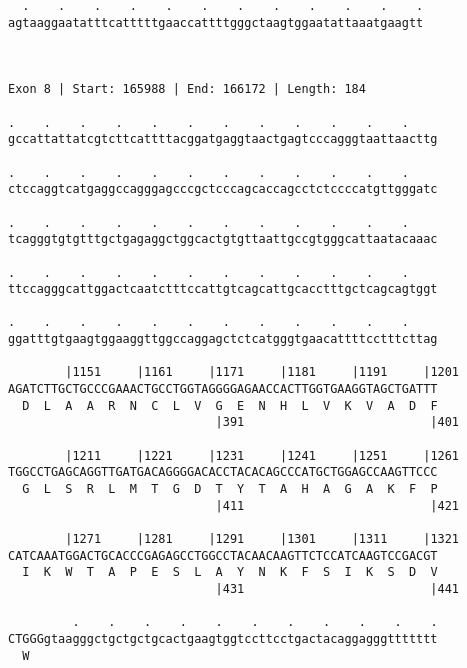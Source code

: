 \documentclass{article}
\begin{document}
\begin{Verbatim}
  .    .    .    .    .    .    .    .    .    .    .    .
agtaaggaatatttcatttttgaaccattttgggctaagtggaatattaaatgaagtt
                                                          
                                                          
 
Exon 8 | Start: 165988 | End: 166172 | Length: 184
 
.    .    .    .    .    .    .    .    .    .    .    .    
gccattattatcgtcttcattttacggatgaggtaactgagtcccagggtaattaacttg
                                                            
.    .    .    .    .    .    .    .    .    .    .    .    
ctccaggtcatgaggccagggagcccgctcccagcaccagcctctccccatgttgggatc
                                                            
.    .    .    .    .    .    .    .    .    .    .    .    
tcagggtgtgtttgctgagaggctggcactgtgttaattgccgtgggcattaatacaaac
                                                            
.    .    .    .    .    .    .    .    .    .    .    .    
ttccagggcattggactcaatctttccattgtcagcattgcacctttgctcagcagtggt
                                                            
.    .    .    .    .    .    .    .    .    .    .    .    
ggatttgtgaagtggaaggttggccaggagctctcatgggtgaacattttcctttcttag
                                                            
        |1151     |1161     |1171     |1181     |1191     |1201
AGATCTTGCTGCCCGAAACTGCCTGGTAGGGGAGAACCACTTGGTGAAGGTAGCTGATTT
  D  L  A  A  R  N  C  L  V  G  E  N  H  L  V  K  V  A  D  F
                             |391                          |401
  
        |1211     |1221     |1231     |1241     |1251     |1261
TGGCCTGAGCAGGTTGATGACAGGGGACACCTACACAGCCCATGCTGGAGCCAAGTTCCC
  G  L  S  R  L  M  T  G  D  T  Y  T  A  H  A  G  A  K  F  P
                             |411                          |421
  
        |1271     |1281     |1291     |1301     |1311     |1321
CATCAAATGGACTGCACCCGAGAGCCTGGCCTACAACAAGTTCTCCATCAAGTCCGACGT
  I  K  W  T  A  P  E  S  L  A  Y  N  K  F  S  I  K  S  D  V
                             |431                          |441
  
         .    .    .    .    .    .    .    .    .    .    .
CTGGGgtaagggctgctgctgcactgaagtggtccttcctgactacaggagggttttttt
  W                                                         
                                                            

\end{Verbatim}
\end{document}
